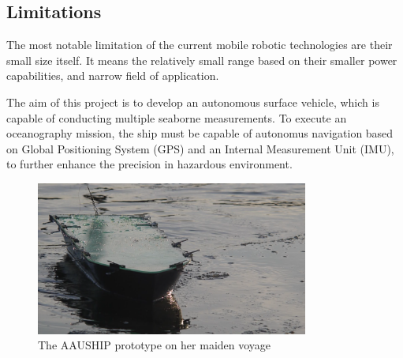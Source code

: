 \subsection*{Limitations}

The most notable limitation of the current mobile robotic technologies are their small size itself. It means the relatively small range based on their smaller power capabilities, and narrow field of application.

The aim of this project is to develop an autonomous surface vehicle, which is capable of conducting multiple seaborne measurements. To execute an oceanography mission, the ship must be capable of autonomus navigation based on Global Positioning System (GPS) and an Internal Measurement Unit (IMU), to further enhance the precision in hazardous environment.

\begin{figure}[H]
	\centering
	\includegraphics[width=0.8\textwidth]{img/aauship}
	\caption{The AAUSHIP prototype on her maiden voyage}
	\label{fig:aauship}
\end{figure}

